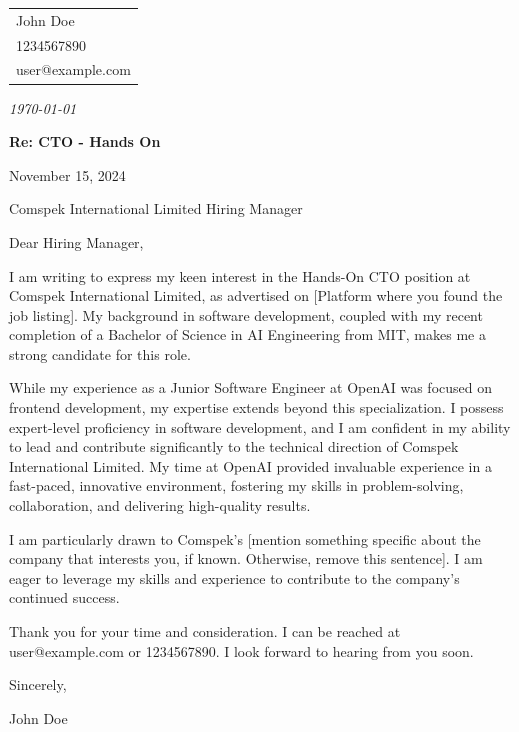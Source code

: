 \documentclass[11pt, letterpaper]{article}
\makeatletter
\newcommand{\name}{John Doe}
\newcommand{\location}{}
\newcommand{\email}{user@example.com}
\newcommand{\phone}{1234567890}
\newcommand{\jobTitle}{CTO - Hands On}
\makeatother
\begin{document}
\noindent
\hfill
\begin{tabular}{@{}l@{}}
    \name \\[0.1cm]
    \phone \\
    \email \\
    \location
\end{tabular}

\vspace{0.5cm}

\noindent\textit{\today}

\vspace{0.2cm}

\noindent\textbf{Re: \jobTitle}

\vspace{0.5cm}

November 15, 2024

\vspace{1em}
Comspek International Limited
Hiring Manager

\vspace{1em}
Dear Hiring Manager,

\vspace{1em}
I am writing to express my keen interest in the Hands-On CTO position at Comspek International Limited, as advertised on [Platform where you found the job listing].  My background in software development, coupled with my recent completion of a Bachelor of Science in AI Engineering from MIT, makes me a strong candidate for this role.

\vspace{1em}
While my experience as a Junior Software Engineer at OpenAI was focused on frontend development, my expertise extends beyond this specialization.  I possess expert-level proficiency in software development, and I am confident in my ability to lead and contribute significantly to the technical direction of Comspek International Limited.  My time at OpenAI provided invaluable experience in a fast-paced, innovative environment, fostering my skills in problem-solving, collaboration, and delivering high-quality results.

\vspace{1em}
I am particularly drawn to Comspek's [mention something specific about the company that interests you, if known.  Otherwise, remove this sentence].  I am eager to leverage my skills and experience to contribute to the company's continued success.

\vspace{1em}
Thank you for your time and consideration. I can be reached at user@example.com or 1234567890.  I look forward to hearing from you soon.

\vspace{1em}
Sincerely,

\vspace{1em}
John Doe
\end{document}

